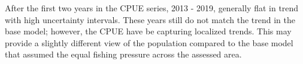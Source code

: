 \documentclass[11pt,
  english,
  a4paper,
]{article}
\begin{document}
\leavevmode\tagmcend\tagstructend\par


After the first two years in the CPUE series, 2013 - 2019, generally flat in trend with high uncertainty intervals. These years still do not match the trend in the base model; however, the CPUE have be capturing localized trends. This may provide a slightly different view of the population compared to the base model that assumed the equal fishing pressure across the assessed area.

\leavevmode\tagmcend\tagstructend\par
\end{document}
